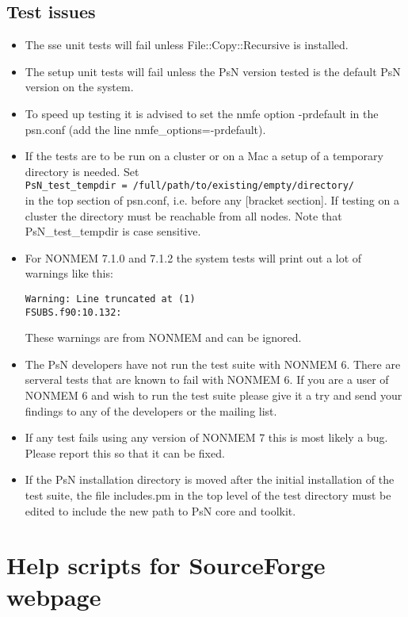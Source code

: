 \subsection{Test issues}
\begin{itemize}
    \item The sse unit tests will fail unless File::Copy::Recursive is installed.
    \item The setup unit tests will fail unless the PsN version tested is the default PsN version on the system.
	\item To speed up testing it is advised to set the nmfe option -prdefault in the psn.conf (add the line nmfe\_options=-prdefault).
	\item If the tests are to be run on a cluster or on a Mac a setup of a temporary directory is needed. Set\\
    \verb|PsN_test_tempdir = /full/path/to/existing/empty/directory/| \\
    in the top section of psn.conf, i.e. before any [bracket section].
     If testing on a cluster the directory must be reachable from all nodes.
     Note that PsN\_test\_tempdir is case sensitive.
	\item For NONMEM 7.1.0 and 7.1.2 the system tests will print out a lot of warnings like this:
\begin{verbatim}
Warning: Line truncated at (1)
FSUBS.f90:10.132:
\end{verbatim}
These warnings are from NONMEM and can be ignored.
	\item	The PsN developers have not run the test suite with NONMEM 6. There are serveral tests that are known to fail with NONMEM 6. If you are a user of NONMEM 6 and wish to run the test suite please give it a try and send your findings to any of the developers or the mailing list.
	\item If any test fails using any version of NONMEM 7 this is most likely a bug. Please report this so that it can be fixed.
    \item If the PsN installation directory is moved after the initial installation of the test suite, the file includes.pm in the top level of the test directory
    must be edited to include the new path to PsN core and toolkit. 
\end{itemize} 

\section{Help scripts for SourceForge webpage}

